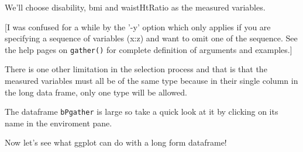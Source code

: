 \documentclass[titlepage]{book}\usepackage{knitr}
\begin{document}
We'll choose disability, bmi and waistHtRatio as the measured variables.

[I was confused for a while by the '-y' option which only applies if you are specifying a sequence of variables (x:z) and want to omit one of the sequence.  See the help pages on \texttt{gather()} for complete definition of arguments and examples.]

There is one other limitation in the selection process and that is that the measured variables must all be of the same type because in their single column in the long data frame, only one type will be allowed.


\begin{knitrout}
\color{fgcolor}
\end{knitrout}

The dataframe \texttt{bPgather} is large so take a quick look at it by clicking on its name in the enviroment pane.

Now let's see what ggplot can do with a long form dataframe!

\begin{knitrout}
\color{fgcolor}\begin{kframe}
\begin{alltt}
 \hlkwb{<-}  \hlstd{(} \hlstd{=}    
 \hlkwb{<-}  \hlopt{+} \hlstd{()}
\end{alltt}
\end{kframe}
\end{knitrout}

\begin{knitrout}
\color{fgcolor}\begin{kframe}
\begin{alltt}
 \hlkwb{<-}  \hlstd{(}    
 \hlkwb{<-}  \hlopt{+} \hlstd{()}
\end{alltt}
\end{kframe}
\end{knitrout}
\end{document}
